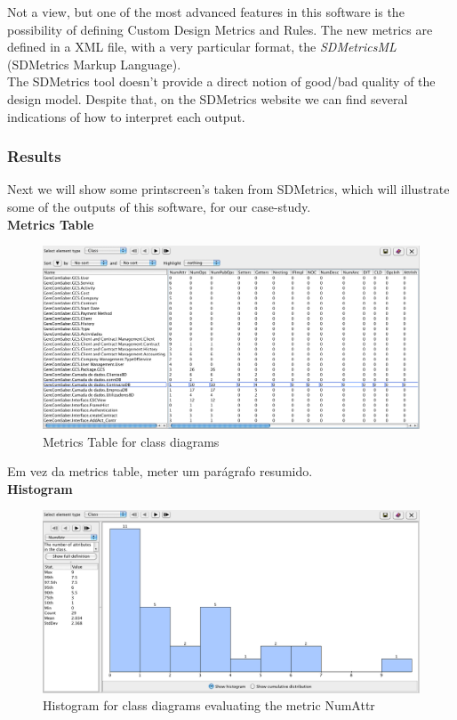 Not a view, but one of the most advanced features in this software is the possibility of defining Custom Design Metrics and Rules. The new metrics are defined in a XML file, with a very particular format, the \textit{SDMetricsML} (SDMetrics Markup Language). \\
The SDMetrics tool doesn't provide a direct notion of good/bad quality of the design model. Despite that, on the SDMetrics website we can find several indications of how to interpret each output. 
 
\subsubsection{Results}

Next we will show some printscreen's taken from SDMetrics, which will illustrate some of the outputs of this software, for our case-study.\\

\textbf{Metrics Table}
\begin{figure}[H]
\begin{center}
\includegraphics[width=1\textwidth]{images/table.png}
\caption{Metrics Table for class diagrams}\label{img:table}
\end{center}
\end{figure} 

Em vez da metrics table, meter um parágrafo resumido.\\

\textbf{Histogram}
\begin{figure}[H]
\begin{center}
\includegraphics[width=1\textwidth]{images/histogram.png}
\caption{Histogram for class diagrams evaluating the metric NumAttr}\label{img:histogram}
\end{center}
\end{figure} 

